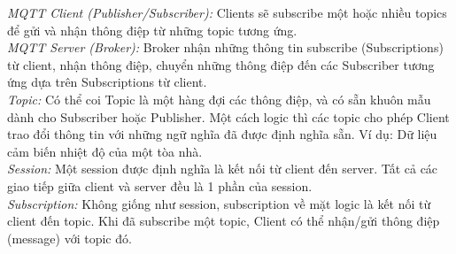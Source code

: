 \indent \textit{MQTT Client (Publisher/Subscriber):} Clients sẽ subscribe một hoặc nhiều topics để gửi và nhận thông điệp từ những topic tương ứng.\\
\indent \textit{MQTT Server (Broker):} Broker nhận những thông tin subscribe (Subscriptions) từ client, nhận thông điệp, chuyển những thông điệp đến các Subscriber tương ứng dựa trên Subscriptions từ client.\\
\indent \textit{Topic:} Có thể coi Topic là một hàng đợi các thông điệp, và có sẵn khuôn mẫu dành cho Subscriber hoặc Publisher. Một cách logic thì các topic cho phép Client trao đổi thông tin với những ngữ nghĩa đã được định nghĩa sẵn. Ví dụ: Dữ liệu cảm biến nhiệt độ của một tòa nhà.\\
\indent \textit{Session:} Một session được định nghĩa là kết nối từ client đến server. Tất cả các giao tiếp giữa client và server đều là 1 phần của session.\\
\indent \textit{Subscription:} Không giống như session, subscription về mặt logic là kết nối từ client đến topic. Khi đã subscribe một topic, Client có thể nhận/gửi thông điệp (message) với topic đó.

